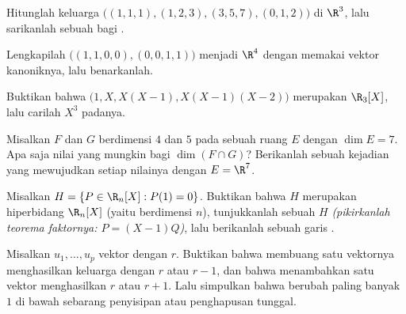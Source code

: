 \begin{exercise}[$\star$]\label{exo:b1:findim:2}
Hitunglah  keluarga
$\bigl((1,1,1), (1,2,3), (3,5,7), (0,1,2)\bigr)$ di $\R^3$, lalu
sarikanlah sebuah  bagi .
\end{exercise}

\begin{exercise}[$\star$]\label{exo:b1:findim:3}
Lengkapilah  $\bigl((1,1,0,0), (0,0,1,1)\bigr)$ menjadi
 $\R^4$ dengan memakai vektor kanoniknya, lalu benarkanlah.
\end{exercise}

\begin{exercise}[$\star$]\label{exo:b1:findim:4}
Buktikan bahwa $\bigl(1, X, X(X-1), X(X-1)(X-2)\bigr)$ merupakan 
$\R_3[X]$, lalu carilah  $X^3$ padanya.
\end{exercise}

\begin{exercise}[$\star\star$]\label{exo:b1:findim:5}
Misalkan $F$ dan $G$  berdimensi $4$ dan $5$ pada sebuah ruang
$E$ dengan $\dim E = 7$. Apa saja nilai yang mungkin bagi $\dim(F \cap
G)$? Berikanlah sebuah kejadian yang mewujudkan setiap nilainya dengan $E = \R^7$.
\end{exercise}

\begin{exercise}[$\star\star$]\label{exo:b1:findim:6}
Misalkan $H = \{P \in \R_n[X] : P(1) = 0\}$. Buktikan bahwa $H$ merupakan
hiperbidang $\R_n[X]$ (yaitu  berdimensi $n$), tunjukkanlah sebuah
 $H$ \emph{(pikirkanlah teorema faktornya: $P = (X-1)Q$)}, lalu
berikanlah sebuah garis .
\end{exercise}

\begin{exercise}[$\star\star$]\label{exo:b1:findim:7}
Misalkan $u_1, \dots, u_p$ vektor dengan  $r$. Buktikan bahwa membuang
satu vektornya menghasilkan keluarga dengan  $r$ atau $r - 1$, dan bahwa
menambahkan satu vektor menghasilkan  $r$ atau $r + 1$. Lalu simpulkan bahwa 
berubah paling banyak $1$ di bawah sebarang penyisipan atau penghapusan tunggal.
\end{exercise}

